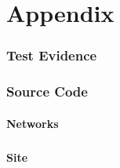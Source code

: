\newpage
\part{Appendix}
\appendix

\section{Test Evidence}

\section{Source Code}
    \subsection{Networks}
        \subsubsection{}
    \subsection{Site}
        \subsubsection{}

